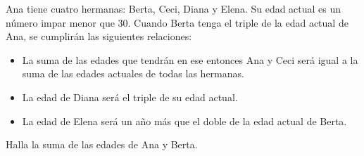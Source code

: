 Ana tiene cuatro hermanas: Berta, Ceci, Diana y Elena. Su edad actual es un número impar menor que $30$. Cuando Berta tenga el triple de la edad actual de Ana, se cumplirán las siguientes relaciones:
 \begin{itemize} 
 \item  La suma de las edades que tendrán en ese entonces Ana y Ceci será igual a la suma de las edades actuales de todas las hermanas.
 \item  La edad de Diana será el triple de su edad actual.
 \item  La edad de Elena será un año más que el doble de la edad actual de Berta.
 \end{itemize} 
Halla la suma de las edades de Ana y Berta.